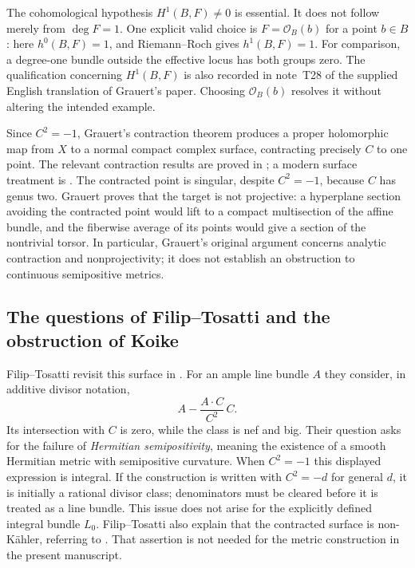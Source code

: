 \documentclass[11pt,a4paper]{article}
\numberwithin{equation}{section}
\theoremstyle{definition}
\theoremstyle{remark}
\begin{document}
The cohomological hypothesis $H^1(B,F)\ne0$ is essential.  It does not follow
merely from $\deg F=1$.  One explicit valid choice is
$F=\mathcal O_B(b)$ for a point $b\in B$: here $h^0(B,F)=1$, and
Riemann--Roch gives $h^1(B,F)=1$.  For comparison, a degree-one bundle outside
the effective locus has both groups zero.  The qualification concerning
$H^1(B,F)$ is also recorded in note~T28 of the supplied English translation
of Grauert's paper.  Choosing $\mathcal O_B(b)$ resolves it without altering
the intended example.

Since $C^2=-1$, Grauert's contraction theorem produces a proper holomorphic
map from $X$ to a normal compact complex surface, contracting precisely $C$
to one point.  The relevant contraction results are proved in
\cite[\S3 and \S4, paragraph~8(e)]{Grauert1962}; a modern surface treatment is
\cite[Chapter~III, \S2]{BHPV2004}.  The contracted point is singular, despite
$C^2=-1$, because $C$ has genus two.  Grauert proves that the target is not
projective: a hyperplane section avoiding the contracted point would lift
to a compact multisection of the affine bundle, and the fiberwise average
of its points would give a section of the nontrivial torsor.  In particular,
Grauert's original argument concerns analytic contraction and
nonprojectivity; it does not establish an obstruction to continuous
semipositive metrics.

\subsection{The questions of Filip--Tosatti and the obstruction of Koike}
\label{hist:ft-koike}

Filip--Tosatti revisit this surface in
\cite[\S2, especially Problem~2.2, p.~2989]{FilipTosatti2018}.  For an ample
line bundle $A$ they consider, in additive divisor notation,
\[
  A-\frac{A\cdot C}{C^2}\,C.
\]
Its intersection with $C$ is zero, while the class is nef and big.  Their
question asks for the failure of \emph{Hermitian semipositivity}, meaning the
existence of a smooth Hermitian metric with semipositive curvature.  When
$C^2=-1$ this displayed expression is integral.  If the construction is
written with $C^2=-d$ for general $d$, it is initially a rational divisor
class; denominators must be cleared before it is treated as a line bundle.
This issue does not arise for the explicitly defined integral bundle $L_0$.
Filip--Tosatti also explain that the contracted surface is non-K\"ahler,
referring to \cite{Moishezon1975}.  That assertion is not needed for the
metric construction in the present manuscript.
\end{document}
